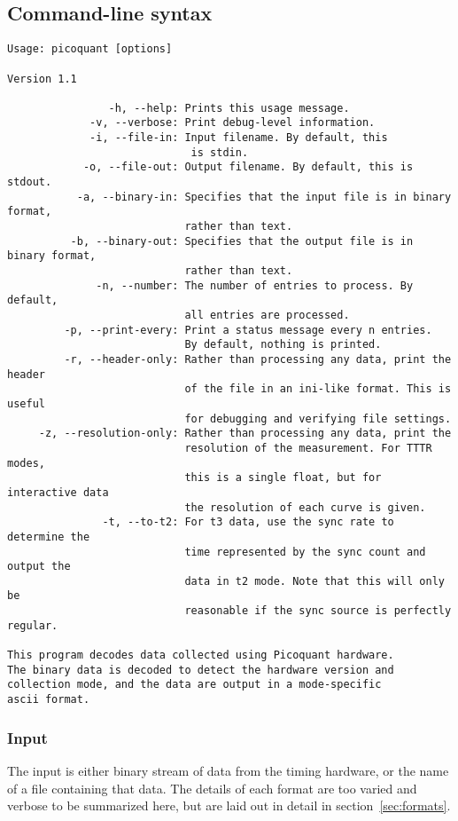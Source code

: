 \documentclass{article}
\begin{document}
\subsection{Command-line syntax}

\begin{verbatim}
Usage: picoquant [options]

Version 1.1

                -h, --help: Prints this usage message.
             -v, --verbose: Print debug-level information.
             -i, --file-in: Input filename. By default, this 
                             is stdin.
            -o, --file-out: Output filename. By default, this is stdout.
           -a, --binary-in: Specifies that the input file is in binary format,
                            rather than text.
          -b, --binary-out: Specifies that the output file is in binary format,
                            rather than text.
              -n, --number: The number of entries to process. By default, 
                            all entries are processed.
         -p, --print-every: Print a status message every n entries.
                            By default, nothing is printed.
         -r, --header-only: Rather than processing any data, print the header
                            of the file in an ini-like format. This is useful
                            for debugging and verifying file settings.
     -z, --resolution-only: Rather than processing any data, print the 
                            resolution of the measurement. For TTTR modes, 
                            this is a single float, but for interactive data
                            the resolution of each curve is given.
               -t, --to-t2: For t3 data, use the sync rate to determine the
                            time represented by the sync count and output the
                            data in t2 mode. Note that this will only be
                            reasonable if the sync source is perfectly regular.

This program decodes data collected using Picoquant hardware. 
The binary data is decoded to detect the hardware version and
collection mode, and the data are output in a mode-specific
ascii format.
\end{verbatim}

\subsubsection{Input}
The input is either binary stream of data from the timing hardware, or the name of a file containing that data. The details of each format are too varied and verbose to be summarized here, but are laid out in detail in section~\ref{sec:formats}.
\end{document}
